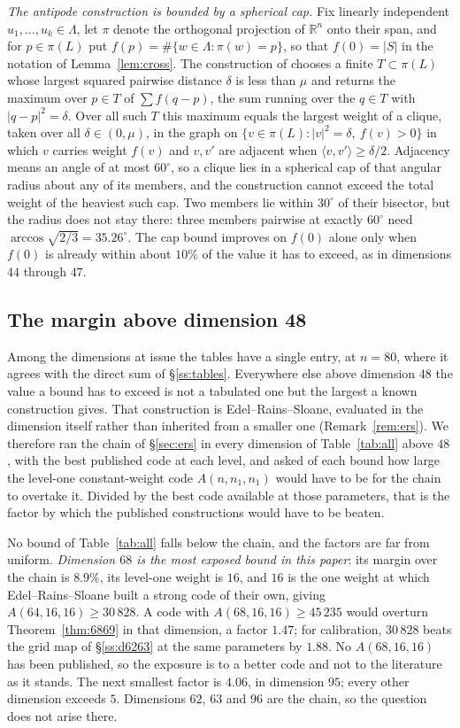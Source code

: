 \documentclass[11pt]{amsart}
\theoremstyle{remark}
\newcommand{\ip}[2]{\langle #1,#2\rangle}
\newcommand{\R}{\mathbb{R}}
\begin{document}
\emph{The antipode construction is bounded by a spherical cap.} Fix linearly
independent $u_1,\dots,u_k\in\Lambda$, let $\pi$ denote the orthogonal projection
of $\R^n$ onto their span, and for $p\in\pi(L)$ put
$f(p)=\#\{w\in\Lambda:\pi(w)=p\}$, so that $f(0)=|S|$ in the notation of
Lemma~\ref{lem:cross}. The construction of \cite{sun-wang2026} chooses a finite
$T\subset\pi(L)$ whose largest squared pairwise distance $\delta$ is less than
$\mu$ and returns the maximum over $p\in T$ of $\sum f(q-p)$, the sum running
over the $q\in T$ with $|q-p|^2=\delta$. Over all such $T$ this maximum equals
the largest weight of a clique, taken over all $\delta\in(0,\mu)$, in the graph
on $\{v\in\pi(L):|v|^2=\delta,\ f(v)>0\}$ in which $v$ carries weight $f(v)$ and
$v,v'$ are adjacent when $\ip{v}{v'}\ge\delta/2$. Adjacency
means an angle of at most $60^\circ$, so a clique lies in a spherical cap of that
angular radius about any of its members, and the construction cannot exceed the
total weight of the heaviest such cap. Two members lie within $30^\circ$ of their
bisector, but the radius does not stay there: three members pairwise at exactly
$60^\circ$ need $\arccos\sqrt{2/3}=35.26^\circ$. The cap bound improves on $f(0)$
alone only when $f(0)$ is already within about $10\%$ of the value it has to
exceed, as in dimensions $44$ through $47$.

\subsection{The margin above dimension 48}\label{ss:exposure}

Among the dimensions at issue the tables have a single entry, at $n=80$, where it
agrees with the direct sum of \S\ref{ss:tables}. Everywhere else above dimension
$48$ the value a bound has to exceed is not a tabulated one but the largest a known
construction gives. That construction
is Edel--Rains--Sloane, evaluated in the dimension itself rather than inherited
from a smaller one (Remark~\ref{rem:ers}). We therefore ran the chain of
\S\ref{sec:ers} in every dimension of Table~\ref{tab:all} above $48$, with the
best published code at each level, and asked of each bound how large the
level-one constant-weight code $A(n,n_1,n_1)$ would have to be for the chain to
overtake it. Divided by the best code available at those parameters, that is the
factor by which the published constructions would have to be beaten.

No bound of Table~\ref{tab:all} falls below the chain, and the factors are far
from uniform. \emph{Dimension $68$ is the
most exposed bound in this paper}: its margin over the chain is $8.9\%$, its
level-one weight is $16$, and $16$ is the one weight at which Edel--Rains--Sloane
built a strong code of their own, giving $A(64,16,16)\ge30\,828$. A code with
$A(68,16,16)\ge45\,235$ would overturn Theorem~\ref{thm:6869} in that dimension,
a factor $1.47$; for calibration, $30\,828$ beats the grid map of
\S\ref{ss:d6263} at the same parameters by $1.88$. No $A(68,16,16)$ has been
published, so the exposure is to a better code and not to the literature as it
stands. The next smallest factor is $4.06$, in dimension $95$; every other
dimension exceeds $5$. Dimensions $62$, $63$ and $96$ are the chain, so the question
does not arise there.
\end{document}
